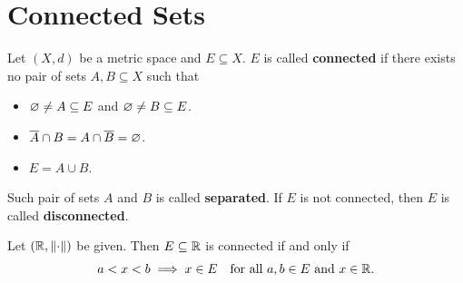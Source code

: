 \section{Connected Sets}

Let $(X, d)$ be a metric space and $E \subseteq X$. $E$ is called \textbf{connected}
if there exists no pair of sets $A, B \subseteq X$ such that
\begin{itemize}
    \item $\vnot \neq A \subseteq E$ and $\vnot \neq B \subseteq E$.
    \item $\overline{A} \cap B = A \cap \overline{B} = \vnot$.
    \item $E = A \cup B$.
\end{itemize}
Such pair of sets $A$ and $B$ is called \textbf{separated}.
If $E$ is not connected, then $E$ is called \textbf{disconnected}.

\bigskip

\begin{theorem} \label{an:thm:connected-sets-in-R}
    Let $(\R, \norm*{\cdot})$ be given. Then $E \subseteq \R$ is connected if and only if
    \[
    a < x < b \implies x \in E \quad \text{for all } a, b \in E \text{ and } x \in \R.
    \]
\end{theorem}

